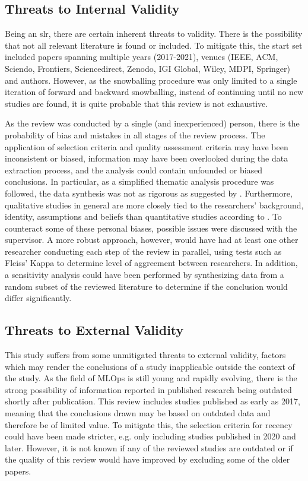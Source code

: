 \subsection{Threats to Internal Validity}
Being an \acrshort{slr}, there are certain inherent threats to validity.
There is the possibility that not all relevant literature is found or included.
To mitigate this, the start set included papers spanning multiple years (2017-2021), venues (IEEE, ACM, Sciendo, Frontiers, Sciencedirect, Zenodo, IGI Global, Wiley, MDPI, Springer) and authors.
However, as the snowballing procedure was only limited to a single iteration of forward and backward snowballing, instead of continuing until no new studies are found, it is quite probable that this review is not exhaustive.

As the review was conducted by a single (and inexperienced) person, there is the probability of bias and mistakes in all stages of the review process.
The application of selection criteria and quality assessment criteria may have been inconsistent or biased, information may have been overlooked during the data extraction process, and the analysis could contain unfounded or biased conclusions.
In particular, as a simplified thematic analysis procedure was followed, the data synthesis was not as rigorous as suggested by \cite{Lochmiller2021}.
Furthermore, qualitative studies in general are more closely tied to the researchers' background, identity, assumptions and beliefs than quantitative studies according to \cite{Oates2005}.
To counteract some of these personal biases, possible issues were discussed with the supervisor.
A more robust approach, however, would have had at least one other researcher conducting each step of the review in parallel, using tests such as Fleiss' Kappa to determine level of aggreement between researchers.
In addition, a sensitivity analysis could have been performed by synthesizing data from a random subset of the reviewed literature to determine if the conclusion would differ significantly.

\subsection{Threats to External Validity}
This study suffers from some unmitigated threats to external validity, factors which may render the conclusions of a study inapplicable outside the context of the study.
As the field of MLOps is still young and rapidly evolving, there is the strong possibility of information reported in published research being outdated shortly after publication.
This review includes studies published as early as 2017, meaning that the conclusions drawn may be based on outdated data and therefore be of limited value.
To mitigate this, the selection criteria for recency could have been made stricter, e.g. only including studies published in 2020 and later.
However, it is not known if any of the reviewed studies are outdated or if the quality of this review would have improved by excluding some of the older papers.

